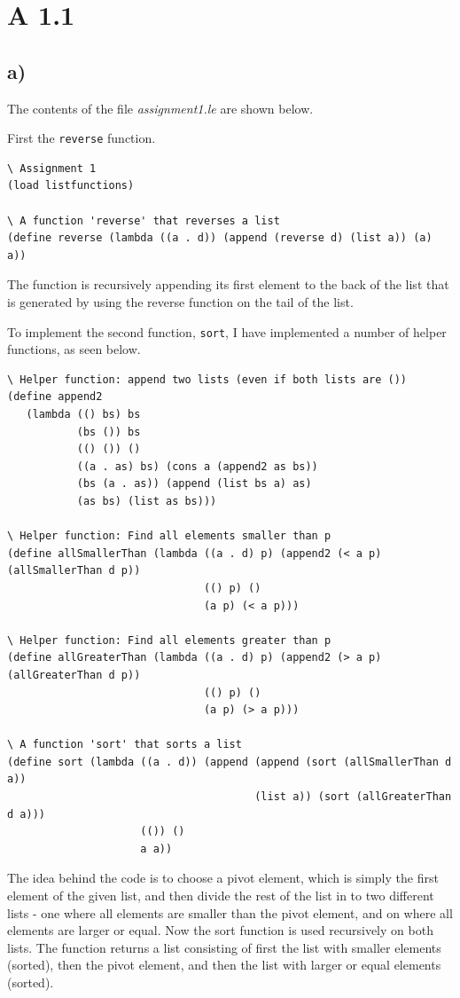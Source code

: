 \section*{A 1.1}

\subsection*{a)}
The contents of the file \textit{assignment1.le} are shown below.

First the \texttt{reverse} function.
\begin{verbatim}
\ Assignment 1
(load listfunctions)

\ A function 'reverse' that reverses a list
(define reverse (lambda ((a . d)) (append (reverse d) (list a)) (a) a))
\end{verbatim}
The function is recursively appending its first element to the back of the list that is generated by using the reverse function on the tail of the list.

To implement the second function, \texttt{sort}, I have implemented a number of helper functions, as seen below.
\begin{verbatim}
\ Helper function: append two lists (even if both lists are ())
(define append2
   (lambda (() bs) bs
           (bs ()) bs
           (() ()) ()
           ((a . as) bs) (cons a (append2 as bs))
           (bs (a . as)) (append (list bs a) as)
           (as bs) (list as bs)))

\ Helper function: Find all elements smaller than p
(define allSmallerThan (lambda ((a . d) p) (append2 (< a p) (allSmallerThan d p))
                               (() p) ()
                               (a p) (< a p)))

\ Helper function: Find all elements greater than p
(define allGreaterThan (lambda ((a . d) p) (append2 (> a p) (allGreaterThan d p))
                               (() p) ()
                               (a p) (> a p)))

\ A function 'sort' that sorts a list
(define sort (lambda ((a . d)) (append (append (sort (allSmallerThan d a)) 
                                       (list a)) (sort (allGreaterThan d a)))
                     (()) ()
                     a a))

\end{verbatim}
The idea behind the code is to choose a pivot element, which is simply the first element of the given list, and then divide the rest of the list in to two different lists - one where all elements are smaller than the pivot element, and on where all elements are larger or equal. Now the sort function is used recursively on both lists. The function returns a list consisting of first the list with smaller elements (sorted), then the pivot element, and then the list with larger or equal elements (sorted).

